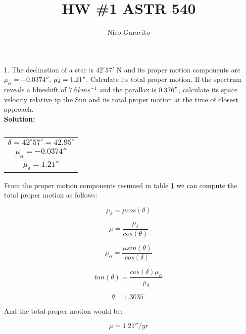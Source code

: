 \documentclass[14pt]{article}
\title{HW \#1 ASTR 540}
\author{Nico Garavito}
\begin{document}
\maketitle

1. The declination of a star is $42^{\circ}57'$ N and its proper
motion components are $\mu_{\alpha}=-0.0374''$, $\mu_{\delta}=1.21"$.
Calculate its total proper motion. If the spectrum reveals a blueshift
of $7.6 kms^{-1}$ and the parallax is $0.376"$, calculate its space
velocity relative tp the Sun and its total proper motion at the time
of closest approach. \\

\textbf{Solution:}

\begin{table}[h]
\centering
\begin{tabular}{c}
\hline
$\delta = 42^{\circ} 57' = 42.95^{\circ}$ \\
$\mu_{\alpha} = -0.0374''$ \\
$\mu_{\delta} = 1.21''$\\
\hline
\end{tabular}
\caption{\label{tab:1}}
\end{table}

From the proper motion components resumed in table \ref{tab:1}
we can compute the total proper motion as follows:

\begin{equation}
\mu_{\delta} = \mu cos(\theta)
\end{equation}

\begin{equation}
\mu = \dfrac{\mu_{\delta}}{cos(\theta)}
\end{equation}

\begin{equation}
\mu_{\alpha} = \dfrac{\mu sin(\theta)}{cos(\delta)}
\end{equation}

\begin{equation}
tan(\theta)=\dfrac{cos(\delta) \mu_{\alpha}}{\mu_{\delta}}
\end{equation}

\begin{equation}
\theta = 1.3035^{\circ}
\end{equation}

And the total proper motion would be:

\begin{equation}
\mu = 1.21 ''/yr
\end{equation}
\end{document}

